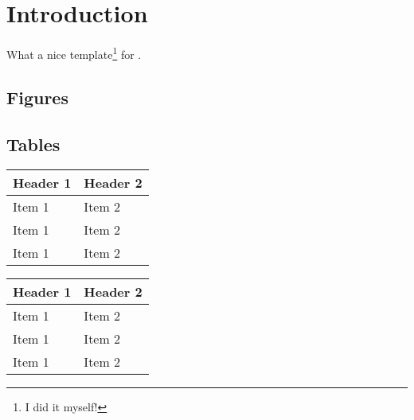 \section*{Introduction}

What a nice template\footnote{I did it myself!} for \citep{Rougier:2017}
. \lipsum*[1]


\subsection*{Figures}

\begin{figure}[htbp]
    \label{fig:1}
\end{figure}

\subsection*{Tables}
\begin{table}[htbp]
\begin{minipage}{.45\textwidth}
  \begin{tabularx}{\textwidth}{|XX|}
      \hline
      \bfseries Header 1 & \bfseries Header 2\\
      \hline
      Item 1 & Item 2\\
      Item 1 & Item 2\\
      Item 1 & Item 2\\
      \hline
    \end{tabularx}
    \label{tab:1}
\end{minipage}
\hfill
\begin{minipage}{.45\textwidth}
  \begin{tabularx}{\textwidth}{|XX|}
      \hline
      \bfseries Header 1 & \bfseries Header 2\\
      \hline
      Item 1 & Item 2\\
      Item 1 & Item 2\\
      Item 1 & Item 2\\
      \hline
    \end{tabularx}
    \label{tab:2}
\end{minipage}
\end{table}

